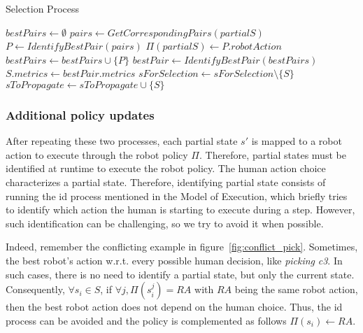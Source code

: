 \begin{algorithm}[h]
\caption{Selection Process}\label{alg:selection}
\begin{algorithmic}[1]

        \State $bestPairs \gets \emptyset$
            \State $pairs \gets GetCorrespondingPairs(partialS)$
            \State $P \gets IdentifyBestPair(pairs)$ 
            \State $\Pi(partialS) \gets P.robotAction$
            \State $bestPairs \gets bestPairs \cup \{P\}$
        \EndFor
        \State 
        \State $bestPair \gets IdentifyBestPair(bestPairs)$
        \State 
        \State $S.metrics \gets bestPair.metrics$
        \State $sForSelection \gets sForSelection \setminus \{S\}$
        \State $sToPropagate \gets sToPropagate \cup \{S\}$
    \EndIf
\EndFor

\end{algorithmic}
\end{algorithm}

    \subsubsection{Additional policy updates}

After repeating these two processes,  each partial state $s'$ is mapped to a robot action to execute through the robot policy $\Pi$. Therefore, partial states must be identified at runtime to execute the robot policy. 
The human action choice characterizes a partial state. Therefore, identifying partial state consists of running the \acrshort{id} process mentioned in the Model of Execution, which briefly tries to identify which action the human is starting to execute during a step. However, such identification can be challenging, so we try to avoid it when possible. 

Indeed, remember the conflicting example in figure~\ref{fig:conflict_pick}. Sometimes, the best robot's action w.r.t. every possible human decision, like \textit{picking} \textit{c3}. In such cases, there is no need to identify a partial state, but only the current state. 
Consequently, $\forall s_i \in S$, if $\forall j, \Pi(s_i^j) = RA$ with $RA$ being the same robot action, then the best robot action does not depend on the human choice. Thus, the \acrshort{id} process can be avoided and the policy is complemented as follows $\Pi(s_i) \gets RA$.

